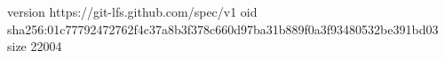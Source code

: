 version https://git-lfs.github.com/spec/v1
oid sha256:01c77792472762f4c37a8b3f378c660d97ba31b889f0a3f93480532be391bd03
size 22004
